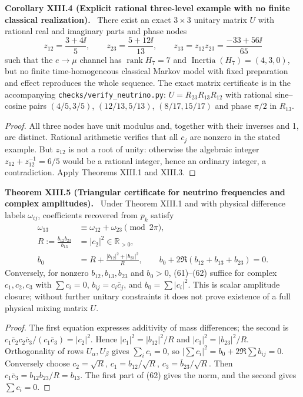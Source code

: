 \documentclass[11pt,a4paper,oneside]{book}
\newcommand{\R}{\mathbb R}\newcommand{\C}{\mathbb C}\newcommand{\Z}{\mathbb Z}\newcommand{\N}{\mathbb N}\newcommand{\Q}{\mathbb Q}
\DeclareMathOperator{\rank}{rank}\DeclareMathOperator{\Tr}{Tr}
\newcommand{\statement}[3]{\par\medskip\noindent\textbf{#1 #2 (#3).}\ }
\begin{document}
\statement{Corollary}{XIII.4}{Explicit rational three-level example with no finite classical realization} There exist an exact $3\times3$ unitary matrix $U$ with rational real and imaginary parts and phase nodes
\[z_{12}=\frac{3+4\ii}5,\qquad z_{23}=\frac{5+12\ii}{13},\qquad z_{13}=z_{12}z_{23}=\frac{-33+56\ii}{65}\]
such that the $e\to\mu$ channel has $\rank H_7=7$ and $\operatorname{Inertia}(H_7)=(4,3,0)$, but no finite time-homogeneous classical Markov model with fixed preparation and effect reproduces the whole sequence. The exact matrix certificate is in the accompanying \texttt{checks/verify\_neutrino.py}: $U=R_{23}R_{13}R_{12}$ with rational sine--cosine pairs $(4/5,3/5)$, $(12/13,5/13)$, $(8/17,15/17)$ and phase $\pi/2$ in $R_{13}$.
\begin{proof}All three nodes have unit modulus and, together with their inverses and 1, are distinct. Rational arithmetic verifies that all $c_j$ are nonzero in the stated example. But $z_{12}$ is not a root of unity: otherwise the algebraic integer $z_{12}+z_{12}^{-1}=6/5$ would be a rational integer, hence an ordinary integer, a contradiction. Apply Theorems XIII.1 and XIII.3.\end{proof}
\statement{Theorem}{XIII.5}{Triangular certificate for neutrino frequencies and complex amplitudes} Under Theorem XIII.1 and with physical difference labels $\omega_{ij}$, coefficients recovered from $p_k$ satisfy
\begin{align}\omega_{13}&\equiv\omega_{12}+\omega_{23}\pmod{2\pi},\tag{60}\\
R:=\frac{b_{12}b_{23}}{b_{13}}&=|c_2|^2\in\R_{>0},\tag{61}\\
b_0&=R+\frac{|b_{12}|^2+|b_{23}|^2}{R},\qquad b_0+2\Re(b_{12}+b_{13}+b_{23})=0.\tag{62}\end{align}
Conversely, for nonzero $b_{12},b_{13},b_{23}$ and $b_0>0$, (61)--(62) suffice for complex $c_1,c_2,c_3$ with $\sum c_i=0$, $b_{ij}=c_i\overline c_j$, and $b_0=\sum|c_i|^2$. This is scalar amplitude closure; without further unitary constraints it does not prove existence of a full physical mixing matrix $U$.
\begin{proof}The first equation expresses additivity of mass differences; the second is $c_1\overline c_2c_2\overline c_3/(c_1\overline c_3)=|c_2|^2$. Hence $|c_1|^2=|b_{12}|^2/R$ and $|c_3|^2=|b_{23}|^2/R$. Orthogonality of rows $U_\alpha,U_\beta$ gives $\sum_i c_i=0$, so $|\sum c_i|^2=b_0+2\Re\sum b_{ij}=0$. Conversely choose $c_2=\sqrt R$, $c_1=b_{12}/\sqrt R$, $c_3=\overline b_{23}/\sqrt R$. Then $c_1\overline c_3=b_{12}b_{23}/R=b_{13}$. The first part of (62) gives the norm, and the second gives $\sum c_i=0$.\end{proof}
\end{document}
